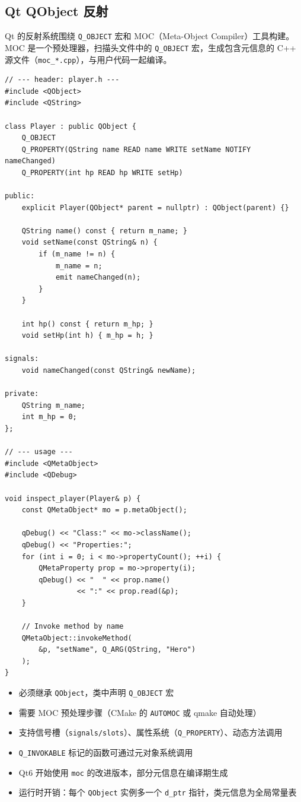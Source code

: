 \documentclass[12pt,a4paper,fontset=fandol]{ctexbook}
\begin{document}
\subsection{Qt QObject 反射}\label{subsec:qt}

Qt 的反射系统围绕 \texttt{Q\_OBJECT} 宏和 MOC（Meta-Object Compiler）工具构建。MOC 是一个预处理器，扫描头文件中的 \texttt{Q\_OBJECT} 宏，生成包含元信息的 C++ 源文件（\texttt{moc\_*.cpp}），与用户代码一起编译。

\begin{lstlisting}[caption={Qt QObject: 信号槽与属性反射}]
// --- header: player.h ---
#include <QObject>
#include <QString>

class Player : public QObject {
    Q_OBJECT
    Q_PROPERTY(QString name READ name WRITE setName NOTIFY nameChanged)
    Q_PROPERTY(int hp READ hp WRITE setHp)

public:
    explicit Player(QObject* parent = nullptr) : QObject(parent) {}

    QString name() const { return m_name; }
    void setName(const QString& n) {
        if (m_name != n) {
            m_name = n;
            emit nameChanged(n);
        }
    }

    int hp() const { return m_hp; }
    void setHp(int h) { m_hp = h; }

signals:
    void nameChanged(const QString& newName);

private:
    QString m_name;
    int m_hp = 0;
};

// --- usage ---
#include <QMetaObject>
#include <QDebug>

void inspect_player(Player& p) {
    const QMetaObject* mo = p.metaObject();

    qDebug() << "Class:" << mo->className();
    qDebug() << "Properties:";
    for (int i = 0; i < mo->propertyCount(); ++i) {
        QMetaProperty prop = mo->property(i);
        qDebug() << "  " << prop.name()
                 << ":" << prop.read(&p);
    }

    // Invoke method by name
    QMetaObject::invokeMethod(
        &p, "setName", Q_ARG(QString, "Hero")
    );
}
\end{lstlisting}

\begin{note}[title={Qt 反射要点}]
\begin{itemize}[nosep]
  \item 必须继承 \texttt{QObject}，类中声明 \texttt{Q\_OBJECT} 宏
  \item 需要 MOC 预处理步骤（CMake 的 \texttt{AUTOMOC} 或 qmake 自动处理）
  \item 支持信号槽（\texttt{signals/slots}）、属性系统（\texttt{Q\_PROPERTY}）、动态方法调用
  \item \texttt{Q\_INVOKABLE} 标记的函数可通过元对象系统调用
  \item Qt6 开始使用 \texttt{moc} 的改进版本，部分元信息在编译期生成
  \item 运行时开销：每个 \texttt{QObject} 实例多一个 \texttt{d\_ptr} 指针，类元信息为全局常量表
\end{itemize}
\end{note}
\end{document}
